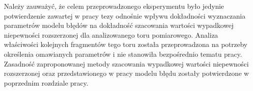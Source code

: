 Należy zauważyć, że celem przeprowadzonego eksperymentu było jedynie potwierdzenie zawartej w pracy tezy odnośnie wpływu dokładności wyznaczania parametrów modelu błędów na dokładność szacowania wartości wypadkowej niepewności rozszerzonej dla analizowanego toru pomiarowego. Analiza właściwości kolejnych fragmentów tego toru została przeprowadzona na potrzeby określenia omawianych parametrów i nie stanowiła bezpośrednio tematu pracy. Zasadność zaproponowanej metody szacowania wypadkowej wartości niepewności rozszerzonej oraz przedstawionego w pracy modelu błędu zostały potwierdzone w poprzednim rozdziale pracy.

